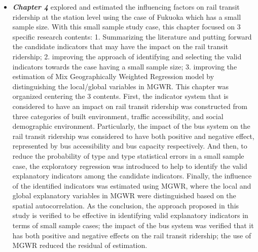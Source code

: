\begin{itemize}
	\item \emph{\textbf{Chapter 4}} explored and estimated the influencing factors on rail transit ridership at the station level using the case of Fukuoka which has a small sample size. With this small sample study case, this chapter focused on 3 specific research contents: 1. Summarizing the literature and putting forward the candidate indicators that may have the impact on the rail transit ridership; 2. improving the approach of identifying and selecting the valid indicators towards the case having a small sample size; 3. improving the estimation of Mix Geographically Weighted Regression model by distinguishing the local/global variables in MGWR.	This chapter was organized centering the 3 contents. First, the indicator system that is considered to have an impact on rail transit ridership was constructed from three categories of built environment, traffic accessibility, and social demographic environment. Particularly, the impact of the bus system on the rail transit ridership was considered to have both positive and negative effect, represented by bus accessibility and bus capacity respectively. And then, to reduce the probability of type \uppercase\expandafter{} and type \uppercase\expandafter{} statistical errors in a small sample case, the exploratory regression was introduced to help to identify the valid explanatory indicators among the candidate indicators. Finally, the influence of the identified indicators was estimated using MGWR, where the local and global explanatory variables in MGWR were distinguished based on the spatial autocorrelation. As the conclusion, the approach proposed in this study is verified to be effective in identifying valid explanatory indicators in terms of small sample cases; the impact of the bus system was verified that it has both positive and negative effects on the rail transit ridership; the use of MGWR reduced the residual of estimation.
	

\end{itemize}
